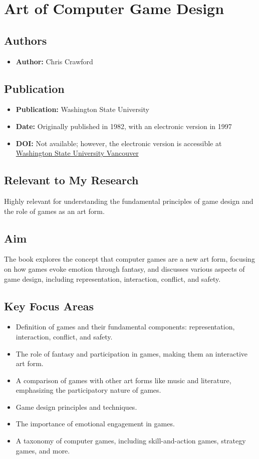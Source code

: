 \section{Art of Computer Game Design}

\subsection{Authors}
\begin{itemize}
    \item \textbf{Author:} Chris Crawford
\end{itemize}

\subsection{Publication}
\begin{itemize}
    \item \textbf{Publication:} Washington State University
    \item \textbf{Date:} Originally published in 1982, with an electronic version in 1997
    \item \textbf{DOI:} Not available; however, the electronic version is accessible at \href{http://www.vancouver.wsu.edu/fac/peabody/game-book/Coverpage.html}{Washington State University Vancouver}
\end{itemize}

\subsection{Relevant to My Research}
Highly relevant for understanding the fundamental principles of game design and the role of games as an art form.

\subsection{Aim}
The book explores the concept that computer games are a new art form, focusing on how games evoke emotion through fantasy, and discusses various aspects of game design, including representation, interaction, conflict, and safety.

\subsection{Key Focus Areas}
\begin{itemize}
    \item Definition of games and their fundamental components: representation, interaction, conflict, and safety.
    \item The role of fantasy and participation in games, making them an interactive art form.
    \item A comparison of games with other art forms like music and literature, emphasizing the participatory nature of games.
    \item Game design principles and techniques.
    \item The importance of emotional engagement in games.
    \item A taxonomy of computer games, including skill-and-action games, strategy games, and more.
\end{itemize}


